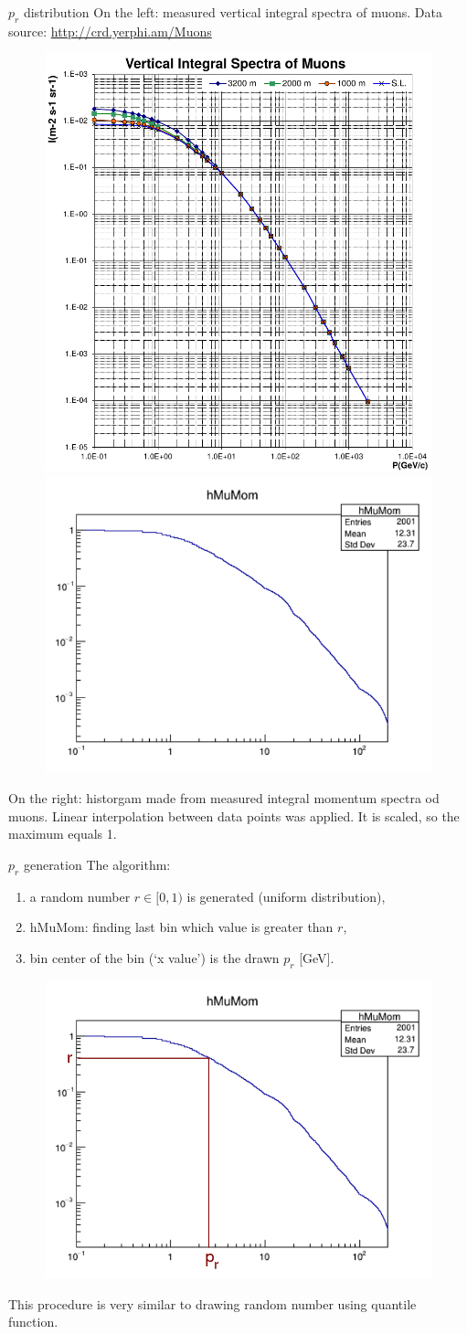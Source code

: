 \documentclass{beamer}
\begin{document}
\begin{frame}{$p_r$ distribution}
On the left: measured vertical integral spectra of muons. Data source: \textcolor{blue}{\href{http://crd.yerphi.am/Muons}{http://crd.yerphi.am/Muons}}
\begin{figure}
\includegraphics[width=.35\textwidth]{images/dataMuonMom.png} 
\includegraphics[width=.55\textwidth]{images/hmomfull.png}
\end{figure}
On the right: historgam made from measured integral momentum spectra od muons. Linear interpolation between data points was applied. It is scaled, so the maximum equals 1.
\end{frame}

\begin{frame}{$p_r$ generation}
The algorithm:
\begin{enumerate}
\item a random number $r \in [0, 1)$ is generated (uniform distribution),
\item hMuMom: finding last bin which value is greater than $r$,
\item bin center of the bin (`x value') is the drawn $p_r$ [GeV].
\end{enumerate}
\begin{figure}
\includegraphics[width=.5\textwidth]{images/drawpr.png} 
\end{figure}
This procedure is very similar to drawing random number using quantile function.
\end{frame}
\end{document}

